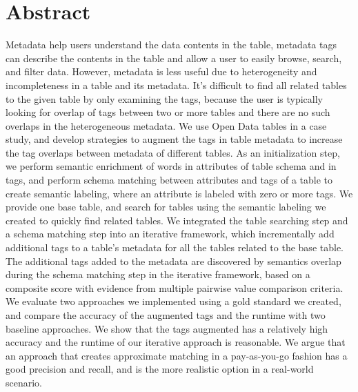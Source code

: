 
\chapter{Abstract}
Metadata help users understand the data contents in the table, metadata tags can describe the contents in the table and allow a user to easily browse, search, and filter data. However, metadata is less useful due to heterogeneity and incompleteness in a table and its metadata. It's difficult to find all related tables to the given table by only examining the tags, because the user is typically looking for overlap of tags between two or more tables and there are no such overlaps in the heterogeneous metadata. We use Open Data tables in a case study, and develop strategies to augment the tags in table metadata to increase the tag overlaps between metadata of different tables. As an initialization step, we perform semantic enrichment of words in attributes of table schema and in tags, and perform schema matching between attributes and tags of a table to create semantic labeling, where an attribute is labeled with zero or more tags. We provide one base table, and search for tables using the semantic labeling we created to quickly find related tables. We integrated the table searching step and a schema matching step into an iterative framework, which incrementally add additional tags to a table’s metadata for all the tables related to the base table. The additional tags added to the metadata are discovered by semantics overlap during the schema matching step in the iterative framework, based on a composite score with evidence from multiple pairwise value comparison criteria. We evaluate two approaches we implemented using a gold standard we created, and compare the accuracy of the augmented tags and the runtime with two baseline approaches. We show that the tags augmented has a relatively high accuracy and the runtime of our iterative approach is reasonable. We argue that an approach that creates approximate matching in a pay-as-you-go fashion has a good precision and recall, and is the more realistic option in a real-world scenario.
\endinput